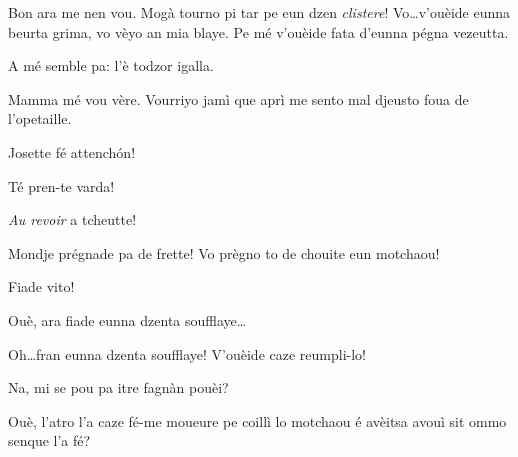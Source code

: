 \begin{drama}

\MedMitchospeaks{} Bon ara me nen vou. Mogà tourno pi tar pe eun dzen \textit{clistere}!  Vo\ldots v'ouèide eunna beurta grima, vo vèyo an mia blaye. Pe mé v'ouèide fata d'eunna pégna vezeutta.

\Gerominespeaks A mé semble pa: l’è todzor igalla.

\Feliespeaks Mamma mé vou vère. Vourriyo jamì que aprì me sento mal djeusto foua de l’opetaille. 

\Gerominespeaks Josette fé attench\'on!


\Gerominespeaks {} Té pren-te varda!

\MedMitchospeaks {} \textit{Au revoir} a tcheutte!


\scene[-- Lo motchaou]



\Eunfeurmispeaks Mondje prégnade pa de frette! Vo prègno to de chouite eun motchaou!


\PersEmpourtantaspeaks Fiade vito!

\Eunfeurmispeaks Ouè, ara fiade eunna dzenta soufflaye\ldots


\Eunfeurmispeaks Oh\ldots fran eunna dzenta soufflaye! V'ouèide caze reumpli-lo!

\Gerominespeaks Na, mi se pou pa itre fagnàn pouèi?

\Casimirspeaks Ouè, l’atro l’a caze fé-me moueure pe coillì lo motchaou é avèitsa avouì sit ommo senque l’a fé? 



\end{drama}
